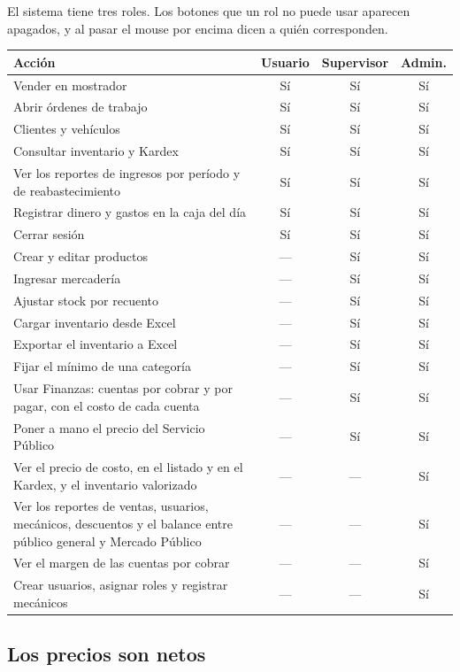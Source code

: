 \documentclass[11pt,a4paper]{article}
\begin{document}
El sistema tiene tres roles. Los botones que un rol no puede usar aparecen
apagados, y al pasar el mouse por encima dicen a quién corresponden.

\begin{center}
\begin{tabular}{p{7.2cm}ccc}
\toprule
\textbf{Acción} & \textbf{Usuario} & \textbf{Supervisor} & \textbf{Admin.} \\
\midrule
Vender en mostrador & Sí & Sí & Sí \\
Abrir órdenes de trabajo & Sí & Sí & Sí \\
Clientes y vehículos & Sí & Sí & Sí \\
Consultar inventario y Kardex & Sí & Sí & Sí \\
Ver los reportes de ingresos por período y de reabastecimiento & Sí & Sí & Sí \\
Registrar dinero y gastos en la caja del día & Sí & Sí & Sí \\
Cerrar sesión & Sí & Sí & Sí \\
\midrule
Crear y editar productos & --- & Sí & Sí \\
Ingresar mercadería & --- & Sí & Sí \\
Ajustar stock por recuento & --- & Sí & Sí \\
Cargar inventario desde Excel & --- & Sí & Sí \\
Exportar el inventario a Excel & --- & Sí & Sí \\
Fijar el mínimo de una categoría & --- & Sí & Sí \\
Usar Finanzas: cuentas por cobrar y por pagar, con el costo de cada cuenta & --- & Sí & Sí \\
Poner a mano el precio del Servicio Público & --- & Sí & Sí \\
\midrule
Ver el precio de costo, en el listado y en el Kardex, y el inventario valorizado & --- & --- & Sí \\
Ver los reportes de ventas, usuarios, mecánicos, descuentos y el balance entre público general y Mercado Público & --- & --- & Sí \\
Ver el margen de las cuentas por cobrar & --- & --- & Sí \\
Crear usuarios, asignar roles y registrar mecánicos & --- & --- & Sí \\
\bottomrule
\end{tabular}
\end{center}

\subsection{Los precios son netos}
\end{document}
